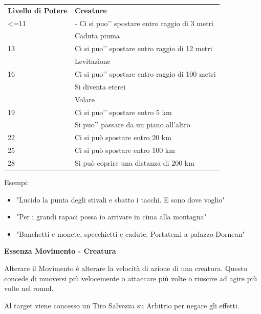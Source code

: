 \documentclass[a4paper,11pt,twoside,openany]{book}
\begin{document}
\begin{tabularx}{0.95\textwidth}{lX}
	\toprule
	\textbf{Livello di Potere} & \textbf{Creature}\\
	<=11           & - Ci si puo'’ spostare entro raggio di 3 metri       \\
	               & Caduta piuma                                         \\
	13             & Ci si puo'’ spostare entro raggio di 12 metri        \\
	               & Levitazione                                          \\
	16             & Ci si puo'’ spostare entro raggio di 100 metri       \\
	               & Si diventa eterei                                    \\
	               & Volare                                               \\
	19             & Ci si puo'’ spostare entro 5 km                      \\
	               & Si puo'’ passare da un piano all’altro               \\
	22             & Ci si può spostare entro 20 km\\
	25             & Ci si può spostare entro 100 km\\
	28             & Si può coprire una distanza di 200 km\\
\end{tabularx}

\bigskip

Esempi:
\begin{itemize}
	\item
	      "Lucido la punta degli stivali e sbatto i tacchi. E sono dove voglio"
	\item
	      "Per i grandi rapaci possa io arrivare in cima alla montagna"
	\item
	      "Banchetti e monete, specchietti e cadute. Portatemi a palazzo Dornean"
\end{itemize}

\bigskip

\textbf{Essenza Movimento - Creatura}

Alterare il Movimento è alterare la velocità di azione di una creatura.
Questo concede di muoversi più velocemente o attaccare più volte o riuscire ad agire più volte nel round.

Al target viene concesso un Tiro Salvezza su Arbitrio per negare gli effetti.
\end{document}
